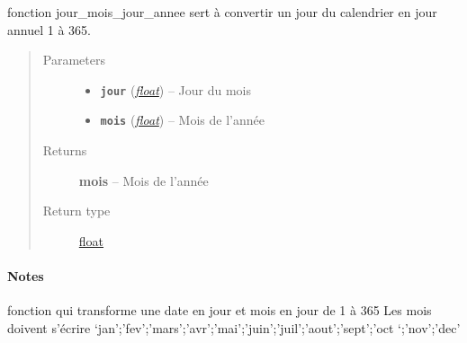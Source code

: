 \documentclass[letterpaper,10pt,english]{sphinxmanual}
\begin{document}
\begin{fulllineitems}
\label{python:solar_mod.jour_mois_jour_annee}
fonction jour\_mois\_jour\_annee sert à convertir un jour du calendrier en jour annuel 1 à 365.
\begin{quote}\begin{description}
\item[{Parameters}] \leavevmode\begin{itemize}
\item {} 
\textbf{\texttt{jour}} (\href{https://docs.python.org/library/functions.html\#float}{\emph{float}}) -- Jour du mois

\item {} 
\textbf{\texttt{mois}} (\href{https://docs.python.org/library/functions.html\#float}{\emph{float}}) -- Mois de l'année

\end{itemize}

\item[{Returns}] \leavevmode
\textbf{mois} -- Mois de l'année

\item[{Return type}] \leavevmode
\href{https://docs.python.org/library/functions.html\#float}{float}

\end{description}\end{quote}
\paragraph{Notes}

fonction qui transforme une date en jour et mois
en jour de 1 à 365
Les mois doivent s'écrire
`jan';'fev';'mars';'avr';'mai';'juin';'juil';'aout';'sept';'oct
`;'nov';'dec'

\end{fulllineitems}

\end{document}
